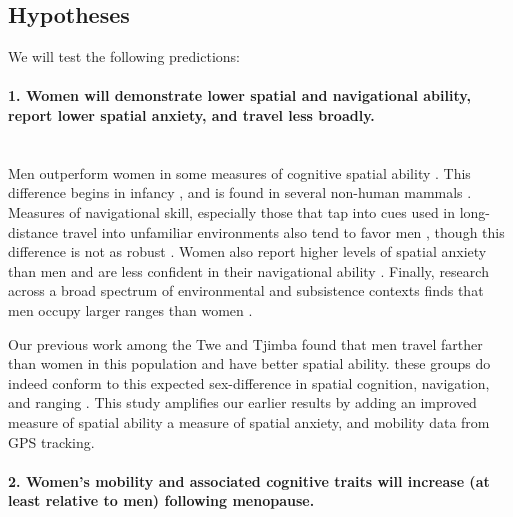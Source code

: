 	\subsection{Hypotheses}
	\label{sec:1.2}
	
We will test the following predictions:	
	
\paragraph{1. Women will demonstrate lower spatial and navigational ability, report lower spatial anxiety, and travel less broadly.}\mbox{}\\

Men outperform women in some measures of cognitive spatial ability \citep{sanders1982sex, shepard1971mental, eals1994hunter, lawton2010gender}.  This difference begins in infancy \citep{quinn2008sex, moore2008mental, levine1999early}, and is found in several non-human mammals \citep{javsarevic2012spatial, perdue2011sex, gaulin1986sex}.  Measures of navigational skill, especially those that tap into cues used in long-distance travel into unfamiliar environments also tend to favor men \citep{moffat1998navigation, bryant1982personality, galea1993sex, henrie1997gender}, though this difference is not as robust \citep{burke2012women, gilmartin1984comparing, montello1999comparison}.  Women also report higher levels of spatial anxiety than men and are less confident in their navigational ability \citep{devlin1995interactive, lawton1994gender, picucci2011besides}.  Finally, research across a broad spectrum of environmental and subsistence contexts finds that men occupy larger ranges than women \citep{ecuyer2004have, gaulin1988evolution, macdonald1999reproductive}.

Our previous work among the Twe and Tjimba found that men travel farther than women in this population and have better spatial ability.  these groups do indeed conform to this expected sex-difference in spatial cognition, navigation, and ranging \citep{vashro2014spatial}. This study amplifies our earlier results by adding an improved measure of spatial ability a measure of spatial anxiety, and mobility data from GPS tracking.

\paragraph{2.  Women's mobility and associated cognitive traits will increase (at least relative to men) following menopause.}\mbox{}\\


